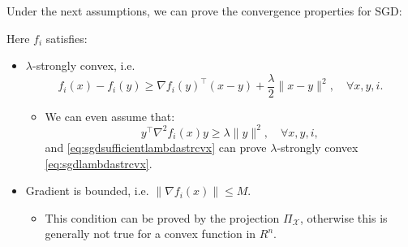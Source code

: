 Under the next assumptions, we can prove the convergence properties for SGD:
\begin{assumption}\label{assum:SGDconvergence}
Here $f_i$ satisfies:
\begin{itemize}
\item $\lambda$-strongly convex, i.e.
\begin{equation}\label{eq:sgdlambdastrcvx}
f_i(x) - f_i(y) \ge \nabla f_i(y)^\top (x-y) + \frac{\lambda}{2}\|x-y\|^2, \quad \forall x, y, i.
\end{equation}
\begin{itemize}
\item We can even assume that: 
\begin{equation}\label{eq:sgdsufficientlambdastrcvx}
y^\top \nabla^2 f_i(x)y \ge \lambda \|y\|^2, \quad \forall x, y, i,
\end{equation}
and \eqref{eq:sgdsufficientlambdastrcvx} can prove $\lambda$-strongly convex \eqref{eq:sgdlambdastrcvx}.
\end{itemize}
\item Gradient is bounded, i.e. $\|\nabla f_i(x)\| \le M$. 
\begin{itemize}
\item This condition can be proved by the projection $\Pi_{\mathcal{X}}$, otherwise this is generally not true for a convex function in $R^n$.
\end{itemize}
\end{itemize}
\end{assumption}


